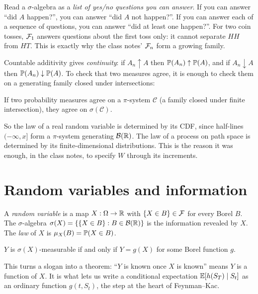 \begin{intuition}
Read a $\sigma$-algebra as a \emph{list of yes/no questions you can answer}. If you can answer ``did $A$ happen?'', you can answer ``did $A$ not happen?''. If you can answer each of a sequence of questions, you can answer ``did at least one happen?''. For two coin tosses, $\mathcal{F}_1$ answers questions about the first toss only: it cannot separate $HH$ from $HT$. This is exactly why the class notes' $\mathcal{F}_n$ form a growing family.
\end{intuition}

Countable additivity gives \emph{continuity}: if $A_n\uparrow A$ then $\mathbb{P}(A_n)\uparrow\mathbb{P}(A)$, and if $A_n\downarrow A$ then $\mathbb{P}(A_n)\downarrow\mathbb{P}(A)$. To check that two measures agree, it is enough to check them on a generating family closed under intersections:

\begin{theorem}\label{thm:pilambda}
If two probability measures agree on a $\pi$-system $\mathcal{C}$ (a family closed under finite intersection), they agree on $\sigma(\mathcal{C})$.
\end{theorem}

So the law of a real random variable is determined by its CDF, since half-lines $(-\infty,x]$ form a $\pi$-system generating $\mathcal{B}(\mathbb{R})$. The law of a process on path space is determined by its finite-dimensional distributions. This is the reason it was enough, in the class notes, to specify $W$ through its increments.

\section{Random variables and information}

\begin{definition}
A \emph{random variable} is a map $X:\Omega\to\mathbb{R}$ with $\{X\in B\}\in\mathcal{F}$ for every Borel $B$. The $\sigma$-algebra $\sigma(X)=\{\{X\in B\}:B\in\mathcal{B}(\mathbb{R})\}$ is the information revealed by $X$. The \emph{law} of $X$ is $\mu_X(B)=\mathbb{P}(X\in B)$.
\end{definition}

\begin{theorem}\label{thm:doobdynkin}
$Y$ is $\sigma(X)$-measurable if and only if $Y=g(X)$ for some Borel function $g$.
\end{theorem}

This turns a slogan into a theorem: ``$Y$ is known once $X$ is known'' means $Y$ is a function of $X$. It is what lets us write a conditional expectation $\mathbb{E}[h(S_T)\mid S_t]$ as an ordinary function $g(t,S_t)$, the step at the heart of Feynman--Kac.

